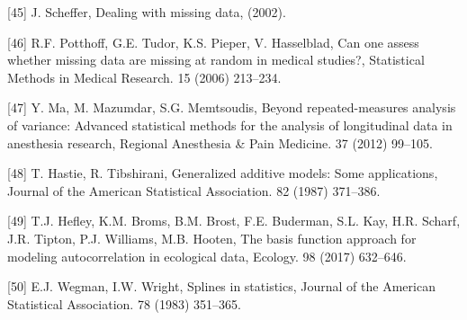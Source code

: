 \documentclass[
]{article}
\begin{document}
\leavevmode\hypertarget{ref-scheffer2002}{}%
{[}45{]} J. Scheffer, Dealing with missing data, (2002).

\leavevmode\hypertarget{ref-potthoff2006}{}%
{[}46{]} R.F. Potthoff, G.E. Tudor, K.S. Pieper, V. Hasselblad, Can one assess whether missing data are missing at random in medical studies?, Statistical Methods in Medical Research. 15 (2006) 213--234.

\leavevmode\hypertarget{ref-ma2012}{}%
{[}47{]} Y. Ma, M. Mazumdar, S.G. Memtsoudis, Beyond repeated-measures analysis of variance: Advanced statistical methods for the analysis of longitudinal data in anesthesia research, Regional Anesthesia \& Pain Medicine. 37 (2012) 99--105.

\leavevmode\hypertarget{ref-hastie1987}{}%
{[}48{]} T. Hastie, R. Tibshirani, Generalized additive models: Some applications, Journal of the American Statistical Association. 82 (1987) 371--386.

\leavevmode\hypertarget{ref-hefley2017}{}%
{[}49{]} T.J. Hefley, K.M. Broms, B.M. Brost, F.E. Buderman, S.L. Kay, H.R. Scharf, J.R. Tipton, P.J. Williams, M.B. Hooten, The basis function approach for modeling autocorrelation in ecological data, Ecology. 98 (2017) 632--646.

\leavevmode\hypertarget{ref-wegman1983}{}%
{[}50{]} E.J. Wegman, I.W. Wright, Splines in statistics, Journal of the American Statistical Association. 78 (1983) 351--365.
\end{document}
